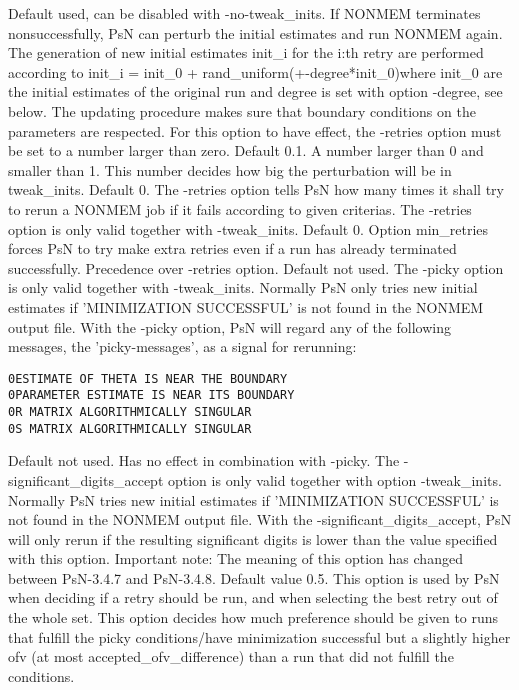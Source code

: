\begin{optionlist}
Default used, can be disabled with -no-tweak\_inits. If NONMEM terminates nonsuccessfully, PsN can perturb the initial estimates and run NONMEM again. The generation of new initial estimates init\_i for the i:th retry are performed according to init\_i = init\_0 + rand\_uniform(+-degree*init\_0)where init\_0 are the initial estimates of the original run
and degree is set with option -degree, see below. 
The updating procedure makes sure that boundary conditions on the parameters are respected. 
For this option to have effect, the -retries option must be set to a number larger than zero. 
\nextopt
{}
Default 0.1. A number larger than 0 and smaller than 1. This number decides how big the perturbation will
be in tweak\_inits.
\nextopt
{}
Default 0. The -retries option tells PsN how many times it shall try to rerun a NONMEM job if it fails according to given criterias. The -retries option is only valid together with -tweak\_inits. 
\nextopt
{}
Default 0. Option min\_retries forces PsN to try make extra retries even if a run has already terminated successfully. Precedence over -retries option.  
\nextopt
{}
Default not used. The -picky option is only valid together with -tweak\_inits. Normally PsN only tries new initial estimates if 'MINIMIZATION SUCCESSFUL' is not found in the NONMEM output file. With the -picky option, PsN will regard any of the following messages, the 'picky-messages',  as a signal for rerunning:


\begin{verbatim}
0ESTIMATE OF THETA IS NEAR THE BOUNDARY
0PARAMETER ESTIMATE IS NEAR ITS BOUNDARY
0R MATRIX ALGORITHMICALLY SINGULAR
0S MATRIX ALGORITHMICALLY SINGULAR
\end{verbatim}
\nextopt
{}
Default not used. Has no effect in combination with -picky. The -significant\_digits\_accept option is only valid together with option -tweak\_inits. Normally PsN tries new initial estimates if 'MINIMIZATION SUCCESSFUL' is not found in the NONMEM output file. With the -significant\_digits\_accept, PsN will only rerun if the resulting significant digits is lower than the value specified with this option. 
\nextopt
{}
Important note: The meaning of this option has changed between PsN-3.4.7 and PsN-3.4.8. Default value 0.5. This option is used by PsN when deciding if a retry should be run, and when selecting the best retry out of the whole set. This option decides how much preference should be given to runs that fulfill the picky conditions/have minimization successful but a slightly higher ofv (at most accepted\_ofv\_difference) than a run that did not fulfill the conditions.  
\nextopt
\end{optionlist}

